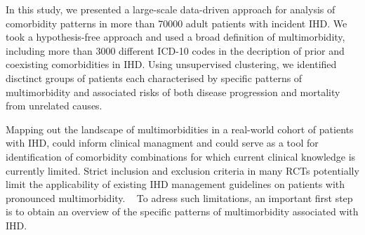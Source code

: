 In this study, we presented a large-scale data-driven approach
for analysis of comorbidity patterns in more than \num{70000} adult 
patients with incident \ac{IHD}.
We took a hypothesis-free approach and used a broad definition of 
multimorbidity, including more than \num{3000} different \ac{ICD-10} codes in
the decription of prior and coexisting comorbidities in \ac{IHD}.
Using unsupervised clustering, we identified disctinct groups of patients 
each characterised by specific patterns of multimorbidity and associated
risks of both disease progression and mortality from unrelated causes.

Mapping out the landscape of multimorbidities in a real-world cohort of 
patients with \ac{IHD}, could inform clinical managment and could serve
as a tool for identification of comorbidity combinations for which
current clinical knowledge is currently limited.
Strict inclusion and exclusion criteria in many \acp{RCT} 
potentially limit the applicability of existing \ac{IHD} 
management guidelines on patients with pronounced multimorbidity.
~\autocite{richKnowledge2016}
To adress such limitations, an important first step is to obtain an overview
of the specific patterns of multimorbidity associated with \ac{IHD}.
